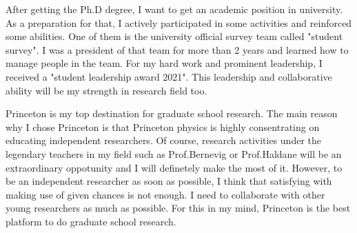 \documentclass[a4]{article}
\begin{document}
After getting the Ph.D degree, I want to get an academic position in university. As a preparation for that, I actively participated in some activities and reinforced some abilities. One of them is the university official survey team called "student survey". I was a president of that team for more than 2 years and learned how to manage people in the team. For my hard work and prominent leadership, I received a "student leadership award 2021". This leadership and collaborative ability will be my strength in research field too.\par
Princeton is my top destination for graduate school research. The main reason why I chose Princeton is that Princeton physics is highly consentrating on educating independent researchers. Of course, research activities under the legendary teachers in my field such as Prof.Bernevig or Prof.Haldane will be an extraordinary oppotunity and I will definetely make the most of it. However, to be an independent researcher as soon as possible, I think that satisfying with making use of given chances is not enough. I need to collaborate with other young researchers as much as possible. For this in my mind, Princeton is the best platform to do graduate school research.




\end{document}
